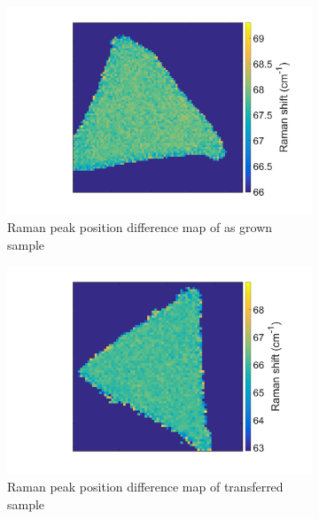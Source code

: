 \begin{figure}[H] %
	\begin{center}
		\begin{subfigure}[b]{0.4\textwidth}
			\includegraphics[scale=0.15]{Transfer/TransferRamanDiffMapAsgrown.png}
			\caption{Raman peak position difference map of as grown sample}
			\label{fig:TransferRamanDiffMapAsgrown}
		\end{subfigure}
		\quad
		\begin{subfigure}[b]{0.4\textwidth}
			\includegraphics[scale=0.15]{Transfer/TransferRamanDiffMapTransferred.png}
			\caption{Raman peak position difference map of transferred sample}
			\label{fig:TransferRamanDiffMapTransferred}
		\end{subfigure}
		\vfill
		\begin{subfigure}[b]{0.4\textwidth}

\end{subfigure}
\end{center}
\end{figure}
